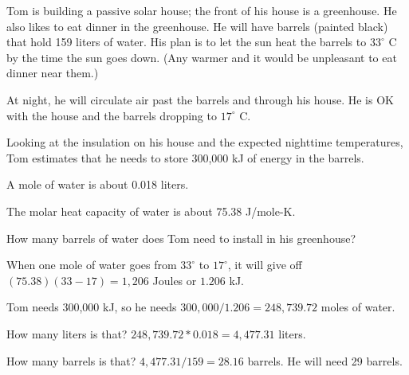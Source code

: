 \begin{Exercise}[title={Using Water For Thermal Energy Storage}, label=waterthermal]
Tom is building a passive solar house; the front of his house is a greenhouse. He also likes to 
eat dinner in the greenhouse. He will have barrels (painted black) that hold 159 liters of water. His plan is to let the sun heat the barrels to $33^\circ$ C by the time the sun goes down. (Any warmer and it would be unpleasant to eat dinner near them.)

At night, he will circulate air past the barrels and through his house. He is OK with the house and the barrels dropping to $17^\circ$ C.

Looking at the insulation on his house and the expected nighttime temperatures, Tom estimates that he needs to store 300,000 kJ of energy in the barrels.

A mole of water is about 0.018 liters.

The molar heat capacity of water is about 75.38 J/mole-K.

How many barrels of water does Tom need to install in his greenhouse?

\end{Exercise}
\begin{Answer}[ref=waterthermal] 

When one mole of water goes from $33^\circ$ to $17^\circ$, it will give off $(75.38)(33-17) = 1,206$ Joules or $1.206$ kJ. 

Tom needs 300,000 kJ, so he needs $300,000/1.206 =  248,739.72$ moles of water.

How many liters is that? $248,739.72 * 0.018 = 4,477.31$ liters.

How many barrels is that? $4,477.31 / 159 = 28.16$ barrels. He will need 29 barrels.
 
\end{Answer}


